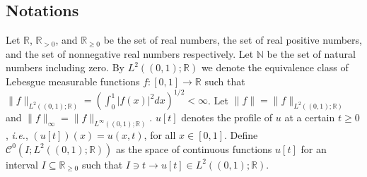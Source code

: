 \documentclass[letterpaper, 10 pt, conference]{ieeeconf}
\begin{document}
\subsection{Notations}
Let $\mathbb{R}$, $\mathbb{R}_{>0}$, and $\mathbb{R}_{\geq0}$ be the set of real numbers, the set of real positive numbers, and the set of nonnegative real numbers respectively. Let $\mathbb{N}$ be the set of natural numbers including zero. By $L^2((0,1);\mathbb{R})$ we denote the equivalence class of Lebesgue measurable functions $f:[0,1]\rightarrow\mathbb{R}$ such that $\|f\|_{L^2((0,1);\mathbb{R})}=\left(\int_0^1|f(x)|^2dx\right)^{1/2}<\infty$. Let $\|f\|=\|f\|_{L^2((0,1);\mathbb{R})}$ and $\|f\|_\infty=\|f\|_{L^\infty((0,1);\mathbb{R})}$. $u[t]$ denotes the profile of $u$ at a certain $t\geq0$, \textit{i.e.}, $(u[t])(x)=u(x,t)$, for all $x\in[0,1]$. Define $\mathcal{C}^0(I;L^2((0,1);\mathbb{R}))$ as the space of continuous functions $u[t]$ for an interval $I\subseteq\mathbb{R}_{\geq 0}$ such that $I\ni t\rightarrow u[t]\in L^2((0,1);\mathbb{R})$. 
\end{document}
